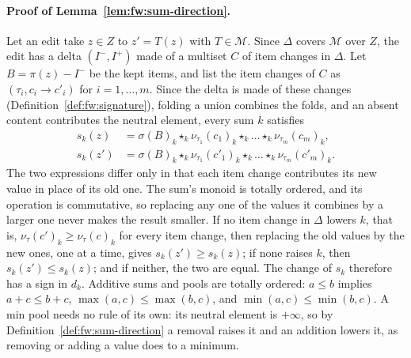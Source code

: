 \paragraph{Proof of Lemma~\ref{lem:fw:sum-direction}.}
Let an edit take $z \in Z$ to $z' = T(z)$ with $T \in \mathcal{M}$. Since $\Delta$ covers $\mathcal{M}$ over $Z$, the
edit has a delta $(I^-, I^+)$ made of a multiset $C$ of item changes in $\Delta$. Let $B = \pi(z) - I^-$ be the kept
items, and list the item changes of $C$ as $(\tau_i, c_i \to c'_i)$ for
$i = 1, \dots, m$. Since the delta is made of these changes (Definition~\ref{def:fw:signature}), folding a union
combines the folds, and an absent content contributes the neutral element, every sum $k$ satisfies
\[
  \begin{aligned}
    s_k(z) &= \sigma(B)_k \star_k \nu_{\tau_1}(c_1)_k \star_k \dots \star_k \nu_{\tau_m}(c_m)_k, \\
    s_k(z') &= \sigma(B)_k \star_k \nu_{\tau_1}(c'_1)_k \star_k \dots \star_k \nu_{\tau_m}(c'_m)_k.
  \end{aligned}
\]
The two expressions differ only in that each item change contributes its new value in place of its old one. The sum's
monoid is totally ordered, and its operation is commutative, so replacing any one of the values it combines by a larger
one never makes the result smaller. If no item change in $\Delta$ lowers $k$, that is, $\nu_\tau(c')_k \ge \nu_\tau(c)_k$
for every item change, then replacing the old values by the new ones, one at a time, gives $s_k(z') \ge s_k(z)$; if none
raises $k$, then $s_k(z') \le s_k(z)$; and if neither, the two are equal. The change of
$s_k$ therefore has a sign in $d_k$. Additive sums and pools are totally ordered:
$a \le b$ implies $a + c \le b + c$, $\max(a, c) \le \max(b, c)$, and $\min(a, c) \le \min(b, c)$. A min pool needs no
rule of its own: its neutral element is $+\infty$, so by Definition~\ref{def:fw:sum-direction} a removal raises it and
an addition lowers it, as removing or adding a value does to a minimum.

